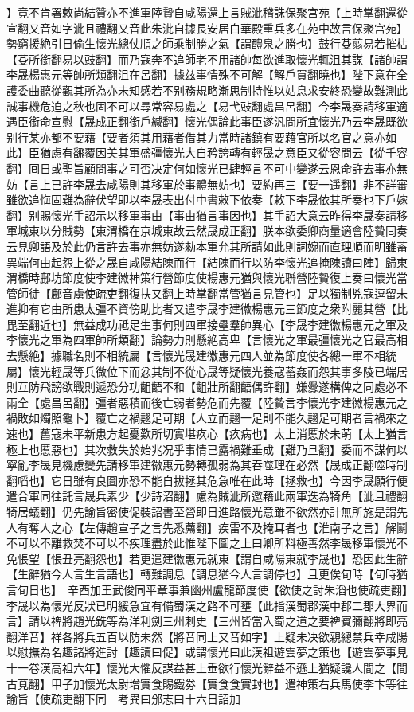 】竟不肯署敕尚結贊亦不進軍陸贄自咸陽還上言賊泚稽誅保聚宫苑【上時掌翻還從宣翻又音如字泚且禮翻又音此朱泚自據長安居白華殿重兵多在苑中故言保聚宫苑】勢窮援絶引日偷生懷光總仗順之師乘制勝之氣【謂醴泉之勝也】鼓行芟翦易若摧枯【芟所銜翻易以豉翻】而乃寇奔不追師老不用諸帥每欲進取懷光輒沮其謀【諸帥謂李晟楊惠元等帥所類翻沮在呂翻】據兹事情殊不可解【解戶買翻曉也】陛下意在全護委曲聽從觀其所為亦未知感若不别務規略漸思制持惟以姑息求安終恐變故難測此誠事機危迫之秋也固不可以尋常容易處之【易弋䜴翻處昌呂翻】今李晟奏請移軍適遇臣銜命宣慰【晟成正翻銜戶緘翻】懷光偶論此事臣遂汎問所宜懷光乃云李晟既欲别行某亦都不要藉【要者須其用藉者借其力當時諸鎮有要藉官所以名官之意亦如此】臣猶慮有飜覆因美其軍盛彊懷光大自矜誇轉有輕晟之意臣又從容問云【從千容翻】囘日或聖旨顧問事之可否决定何如懷光已肆輕言不可中變遂云恩命許去事亦無妨【言上已許李晟去咸陽則其移軍於事體無妨也】要約再三【要一遥翻】非不詳審雖欲追悔固難為辭伏望即以李晟表出付中書敕下依奏【敕下李晟依其所奏也下戶嫁翻】别賜懷光手詔示以移軍事由【事由猶言事因也】其手詔大意云昨得李晟奏請移軍城東以分賊勢【東渭橋在京城東故云然晟成正翻】朕本欲委卿商量適會陸䞇囘奏云見卿語及於此仍言許去事亦無妨遂勑本軍允其所請如此則詞婉而直理順而明雖蓄異端何由起怨上從之晟自咸陽結陳而行【結陳而行以防李懷光追掩陳讀曰陣】歸東渭橋時鄜坊節度使李建徽神策行營節度使楊惠元猶與懷光聨營陸䞇復上奏曰懷光當管師徒【鄜音虜使疏吏翻復扶又翻上時掌翻當管猶言見管也】足以獨制兇寇逗留未進抑有它由所患太彊不資傍助比者又遣李晟李建徽楊惠元三節度之衆附麗其營【比毘至翻近也】無益成功祗足生事何則四軍接壘羣帥異心【李晟李建徽楊惠元之軍及李懷光之軍為四軍帥所類翻】論勢力則懸絶高卑【言懷光之軍最彊懷光之官最高相去懸絶】據職名則不相統屬【言懷光晟建徽惠元四人並為節度使各總一軍不相統屬】懷光輕晟等兵微位下而忿其制不從心晟等疑懷光養寇蓄姦而怨其事多陵已端居則互防飛謗欲戰則遞恐分功齟齬不和【齟壯所翻齬偶許翻】嫌釁遂構俾之同處必不兩全【處昌呂翻】彊者惡積而後亡弱者勢危而先覆【陸䞇言李懷光李建徽楊惠元之禍敗如燭照龜卜】覆亡之禍翹足可期【人立而翹一足則不能久翹足可期者言禍來之速也】舊寇未平新患方起憂歎所切實堪疚心【疚病也】太上消慝於未萌【太上猶言極上也慝惡也】其次救失於始兆况乎事情已露禍難垂成【難乃旦翻】委而不謀何以寧亂李晟見機慮變先請移軍建徽惠元勢轉孤弱為其吞噬理在必然【晟成正翻噬時制翻㗖也】它日雖有良圖亦恐不能自拔拯其危急唯在此時【拯救也】今因李晟願行便遣合軍同往託言晟兵素少【少詩沼翻】慮為賊泚所邀藉此兩軍迭為犄角【泚且禮翻犄居蟻翻】仍先諭旨密使促裝詔書至營即日進路懷光意雖不欲然亦計無所施是謂先人有奪人之心【左傳趙宣子之言先悉薦翻】疾雷不及掩耳者也【淮南子之言】解鬭不可以不離救焚不可以不疾理盡於此惟陛下圖之上曰卿所料極善然李晟移軍懷光不免悵望【悵丑亮翻怨也】若更遣建徽惠元就東【謂自咸陽東就李晟也】恐因此生辭【生辭猶今人言生言語也】轉難調息【調息猶今人言調停也】且更俟旬時【旬時猶言旬日也】　辛酉加王武俊同平章事兼幽州盧龍節度使【欲使之討朱滔也使疏吏翻】　李晟以為懷光反狀已明緩急宜有備蜀漢之路不可壅【此指漢蜀郡漢中郡二郡大界而言】請以禆將趙光銑等為洋利劍三州刺史【三州皆當入蜀之道之要禆賓彌翻將即亮翻洋音】祥各將兵五百以防未然【將音同上又音如字】上疑未决欲親總禁兵幸咸陽以慰撫為名趣諸將進討【趣讀曰促】或謂懷光曰此漢祖遊雲夢之策也【遊雲夢事見十一卷漢高祖六年】懷光大懼反謀益甚上垂欲行懷光辭益不遜上猶疑讒人間之【間古莧翻】甲子加懷光太尉增實食賜鐵劵【實食食實封也】遣神策右兵馬使李卞等往諭旨【使疏吏翻下同　考異曰邠志曰十六日詔加